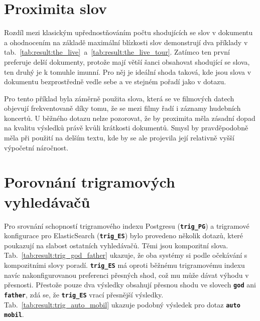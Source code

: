 \documentclass[11pt,letterpaper,oneside,openright]{book}
\newcommand{\bftt}[1]{\texttt{\textbf{#1}}}
\begin{document}
\mbox{}\mbox{}




\section{Proximita slov}
Rozdíl mezi klasickým upřednostňováním počtu shodujících se slov v
dokumentu a ohodnocením na základě maximální blízkosti slov demonstrují
dva příklady v
tab.~\ref{tab:result:the_live}~a~\ref{tab:result:the_live_tour}. Zatímco
ten první preferuje delší dokumenty, protože mají větší šanci obsahovat
shodující se slova, ten druhý je k tomuhle imunní. Pro něj je ideální
shoda taková, kde jsou slova v dokumentu bezprostředně vedle sebe a ve
stejném pořadí jako v dotazu.

Pro tento příklad byla záměrně použita slova, která se ve filmových datech
objevují frekventovaně díky tomu, že se mezi filmy řadí i záznamy hudebních
koncertů. U běžného dotazu nelze pozorovat, že by proximita měla zásadní dopad
na kvalitu výsledků právě kvůli krátkosti dokumentů. Smysl by pravděpodobně
měla při použití na delším textu, kde by se ale projevila její relativně vyšší
výpočetní náročnost.


\mbox{}\mbox{}

\mbox{}\mbox{}


\section{Porovnání trigramových vyhledávačů}
Pro srovnání schopností trigramového indexu Postgresu (\bftt{trig\_PG}) a
trigramové konfigurace pro ElasticSearch (\bftt{trig\_ES}) bylo provedeno
několik dotazů, které poukazují na slabost ostatních vyhledávačů. Těmi jsou
kompozitní slova. Tab.~\ref{tab:result:trig_god_father} ukazuje, že oba systémy
si podle očekávání s kompozitními slovy poradí. \bftt{trig\_ES} má oproti
běžnému trigramovému indexu navíc nakonfigurovanou preferenci přesných shod,
což mu může dávat výhodu v přesnosti. Přestože pouze dva výsledky obsahují
přesnou shodu ve slovech \bftt{god} ani \bftt{father}, zdá se, že
\bftt{trig\_ES} vrací přesnější výsledky. Tab.~\ref{tab:result:trig_auto_mobil}
ukazuje podobný výsledek pro dotaz \bftt{auto mobil}.

\mbox{}\mbox{}

\mbox{}\mbox{}
\end{document}
